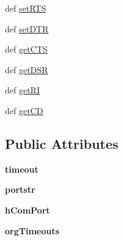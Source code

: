 \begin{DoxyCompactItemize}
\item 
def \hyperlink{classserial_1_1serialwin32_1_1_serial_afb3008aadbf604ff7cc5fa373fb424c2}{set\-R\-T\-S}
\item 
def \hyperlink{classserial_1_1serialwin32_1_1_serial_aa9d340907457356c3ebe533836213e5a}{set\-D\-T\-R}
\item 
def \hyperlink{classserial_1_1serialwin32_1_1_serial_a9be846f1730355c405c64891790d2a7d}{get\-C\-T\-S}
\item 
def \hyperlink{classserial_1_1serialwin32_1_1_serial_a80e2aa9e9d84a3d4b0dd2d98eac2b92c}{get\-D\-S\-R}
\item 
def \hyperlink{classserial_1_1serialwin32_1_1_serial_ac8e1037e285915f7e2c897fb2a6bfcfd}{get\-R\-I}
\item 
def \hyperlink{classserial_1_1serialwin32_1_1_serial_aa40a3bc1db64a222bfca3f60cfc66b85}{get\-C\-D}
\end{DoxyCompactItemize}
\subsection*{Public Attributes}
\begin{DoxyCompactItemize}
\item 
\hypertarget{classserial_1_1serialwin32_1_1_serial_ae703b88bd0d51ad74f5a26930a87c4ae}{{\bfseries timeout}}\label{classserial_1_1serialwin32_1_1_serial_ae703b88bd0d51ad74f5a26930a87c4ae}

\item 
\hypertarget{classserial_1_1serialwin32_1_1_serial_ac8af1a65407a925ad3a0f8e1a704e054}{{\bfseries portstr}}\label{classserial_1_1serialwin32_1_1_serial_ac8af1a65407a925ad3a0f8e1a704e054}

\item 
\hypertarget{classserial_1_1serialwin32_1_1_serial_a7c4227fd3873cc50afc7685e0f8dfbee}{{\bfseries h\-Com\-Port}}\label{classserial_1_1serialwin32_1_1_serial_a7c4227fd3873cc50afc7685e0f8dfbee}

\item 
\hypertarget{classserial_1_1serialwin32_1_1_serial_ad83b96a33d9ff14a24564e3edd6a13d5}{{\bfseries org\-Timeouts}}\label{classserial_1_1serialwin32_1_1_serial_ad83b96a33d9ff14a24564e3edd6a13d5}

\end{DoxyCompactItemize}


